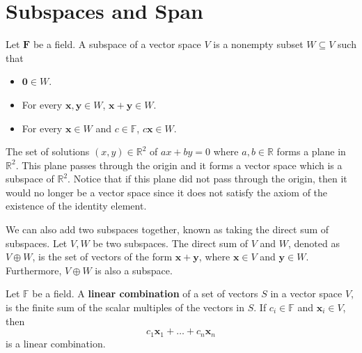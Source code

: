 \documentclass[12pt]{article}
\begin{document}
\section{Subspaces and Span}
\begin{definition}
Let $\mathbf{F}$ be a field. A subspace of a vector space $V$ is a nonempty subset $W\subseteq V$ such that
\begin{itemize}
\item $\mathbf{0}\in W$.
\item For every $\mathbf{x},\mathbf{y}\in W$, $\mathbf{x}+\mathbf{y}\in W$.
\item For every $\mathbf{x}\in W$ and $c\in\mathbb{F}$, $c\mathbf{x}\in W$.
\end{itemize}
\end{definition}
\begin{example}
The set of solutions $(x,y)\in\mathbb{R}^2$ of $ax + by=0$ where $a,b\in\mathbb{R}$ forms a plane in $\mathbb{R}^2$. This plane passes through the origin and it forms a vector space which is a subspace of $\mathbb{R}^2$. Notice that if this plane did not pass through the origin, then it would no longer be a vector space since it does not satisfy the axiom of the existence of the identity element.
\end{example}
\noindent We can also add two subspaces together, known as taking the direct sum of subspaces. Let $V,W$ be two subspaces. The direct sum of $V$ and $W$, denoted as $V \oplus W$, is the set of vectors of the form $\mathbf{x} + \mathbf{y}$, where $\mathbf{x}\in V$ and $\mathbf{y}\in W$. Furthermore, $V \oplus W$ is also a subspace. 
\begin{definition}
Let $\mathbb{F}$ be a field. A \textbf{linear combination} of a set of vectors $S$ in a vector space $V$, is the finite sum of the scalar multiples of the vectors in $S$. If $c_i\in\mathbb{F}$ and $\mathbf{x}_i\in V$, then $$c_1\mathbf{x}_1 + \ldots + c_n\mathbf{x}_n$$ is a linear combination.
\end{definition}
\end{document}
